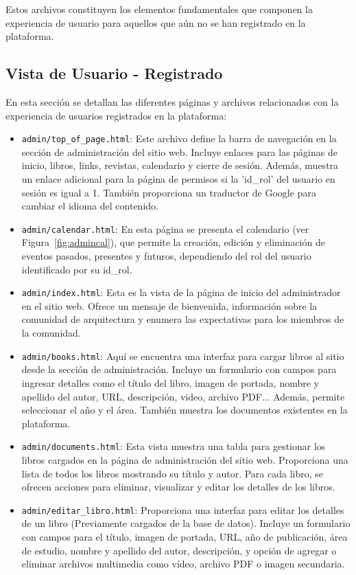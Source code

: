 \documentclass[a4paper, 12pt]{book}
\begin{document}
Estos archivos constituyen los elementos fundamentales que componen la experiencia de usuario para aquellos que aún no se han registrado en la plataforma.

\subsection{Vista de Usuario - Registrado}
\label{sec:vista_usuarios_registrado}
En esta sección se detallan las diferentes páginas y archivos relacionados con la experiencia de usuarios registrados en la plataforma:

\begin{itemize}
  \item \texttt{admin/top\_of\_page.html}: Este archivo define la barra de navegación en la sección de administración del sitio web. Incluye enlaces para las páginas de inicio, libros, links, revistas, calendario y cierre de sesión. Además, muestra un enlace adicional para la página de permisos si la {'id\_rol'} del usuario en sesión es igual a 1. También proporciona un traductor de Google para cambiar el idioma del contenido.
  \item \texttt{admin/calendar.html}: En esta página se presenta el calendario (ver Figura~\ref{fig:admincal}), que permite la creación, edición y eliminación de eventos pasados, presentes y futuros, dependiendo del rol del usuario identificado por su id\_rol.
  \item \texttt{admin/index.html}: Esta es la vista de la página de inicio del administrador en el sitio web. Ofrece un mensaje de bienvenida, información sobre la comunidad de arquitectura y enumera las expectativas para los miembros de la comunidad.
  \item \texttt{admin/books.html}: Aquí se encuentra una interfaz para cargar libros al sitio desde la sección de administración. Incluye un formulario con campos para ingresar detalles como el título del libro, imagen de portada, nombre y apellido del autor, URL, descripción, video, archivo PDF... Además, permite seleccionar el año y el área. También muestra los documentos existentes en la plataforma.
  \item \texttt{admin/documents.html}: Esta vista muestra una tabla para gestionar los libros cargados en la página de administración del sitio web. Proporciona una lista de todos los libros mostrando su título y autor. Para cada libro, se ofrecen acciones para eliminar, visualizar y editar los detalles de los libros.
  \item \texttt{admin/editar\_libro.html}: Proporciona una interfaz para editar los detalles de un libro {(Previamente cargados de la base de datos)}. Incluye un formulario con campos para el título, imagen de portada, URL, año de publicación, área de estudio, nombre y apellido del autor, descripción, y opción de agregar o eliminar archivos multimedia como vídeo, archivo PDF o imagen secundaria.

\end{itemize}
\end{document}

